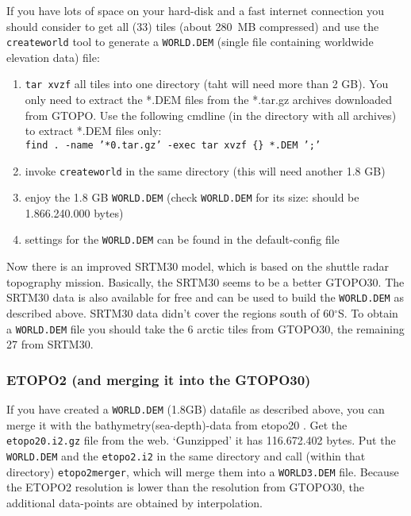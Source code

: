 If you have lots of space on your hard-disk and a fast internet connection you should consider to
get all (33) tiles (about 280~MB compressed) and use the \texttt{createworld}
tool to generate a \texttt{WORLD.DEM} (single file containing worldwide elevation data) file:

\begin{enumerate}
\item \texttt{tar xvzf}  all tiles into one directory (taht will need more than 2 GB).
      You only need to extract the *.DEM files from the *.tar.gz archives
      downloaded from GTOPO. Use the following cmdline (in the directory with
      all archives) to extract *.DEM files only: \\
      \texttt{find . -name '*0.tar.gz' -exec tar xvzf \{\}  *.DEM ';'}

\item invoke \texttt{createworld} in the same directory (this will need another 1.8 GB)

\item enjoy the 1.8 GB \texttt{WORLD.DEM} (check \texttt{WORLD.DEM} for its size:
      should be 1.866.240.000 bytes)

\item settings for the \texttt{WORLD.DEM} can be found in the default-config file

\end{enumerate}

Now there is an improved SRTM30 model, which is based on the shuttle radar topography
mission. Basically, the SRTM30 seems to be a better GTOPO30. The SRTM30 data is also available
for free  and can be used to build the \texttt{WORLD.DEM} as described above. SRTM30 data didn't cover
the regions south of 60$^\circ$S. To obtain a \texttt{WORLD.DEM} file you should take the 6 arctic
tiles from GTOPO30, the remaining 27 from SRTM30.


\subsubsection{ETOPO2 (and merging it into the GTOPO30)}
If you have created a \texttt{WORLD.DEM} (1.8GB) datafile as described above, you can merge it with the bathymetry(sea-depth)-data from etopo20 \cite{etopo2}.
Get the \texttt{etopo20.i2.gz} file from the web. `Gunzipped' it has 116.672.402 bytes.
Put the \texttt{WORLD.DEM} and the \texttt{etopo2.i2} in the same directory and call (within that directory) \texttt{etopo2merger}, which will merge them into a \texttt{WORLD3.DEM} file.
Because the ETOPO2 resolution is lower than the resolution from GTOPO30, the additional data-points are obtained by interpolation.

